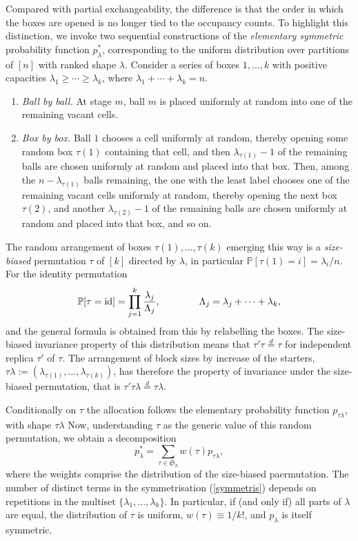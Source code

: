 \documentclass{article}
\begin{document}
Compared with partial exchangeability,
 the difference is that the order in which the boxes are opened is no longer tied to the occupancy counts.
To highlight this distinction, we invoke
two sequential constructions of the {\it elementary symmetric} probability function $p_\lambda^*$, corresponding to the 
uniform distribution over partitions of $[n]$ with
 ranked shape $\lambda$.
 Consider a series of boxes $1,\ldots,k$ with positive capacities $\lambda_1\geq \cdots\geq \lambda_k$, where
$\lambda_1+\cdots+\lambda_k=n$.
\begin{enumerate}

\item[(i)] {\it Ball by ball.}
At stage $m$, ball $m$ is placed uniformly at random into one of the remaining vacant cells.
\item[(ii)] {\it Box by box.}
Ball $1$ chooses a cell uniformly at random, thereby opening some random box $\tau(1)$ containing that cell, and then $\lambda_{\tau(1)}-1$ of the remaining balls are chosen uniformly at random and placed into that box.
Then, among the $n-\lambda_{\tau(1)}$ balls remaining, the one with the least label chooses one of the remaining vacant cells uniformly at random, thereby opening the next box $\tau(2)$, and another $\lambda_{\tau(2)}-1$ of the remaining balls are chosen uniformly at random and placed into that box, and so on.
\end{enumerate}
The random arrangement of boxes $\tau(1),\ldots, \tau(k)$ emerging this way is a {\it size-biased} permutation $\tau$ of $[k]$ directed by $\lambda$, in particular ${\mathbb P}[\tau(1)=i]=\lambda_i/n$.  For the identity permutation 
$${\mathbb P}[\tau={\rm id}]=\prod_{j=1}^k \frac{\lambda_j}{\Lambda_j},~~~\quad\quad~~~\Lambda_j=\lambda_j+\cdots+\lambda_k,$$
and the general formula is obtained  from this   by relabelling the boxes.  
The size-biased invariance property of this distribution means that  $\tau'\tau \stackrel{d}{=}\tau$ for independent replica $\tau'$ of $\tau$.
The arrangement of block sizes by increase of the starters, $\tau\lambda:=(\lambda_{\tau(1)},\ldots,\lambda_{\tau(k)})$, has therefore the property of invariance under the size-biased permutation, that is
$\tau'\tau\lambda\stackrel{d}{=}\tau\lambda$.



Conditionally on $\tau$  the allocation follows the elementary probability function $p_{\tau\lambda}$, with shape $\tau\lambda$
Now, understanding $\tau$ as the generic value of this random permutation, we obtain
a decomposition
\begin{equation}\label{symmetris}
p_\lambda^*=\sum_{\tau\in{\mathfrak S}_k} w(\tau)p_{\tau\lambda},
\end{equation}
where the weights comprise the  distribution of the size-biased paermutation. 
The number of distinct terms in the symmetrisation (\ref{symmetris}) depends on repetitions in the multiset $\{\lambda_1,\ldots,\lambda_k\}$.
 In particular, if (and only if) all parts of $\lambda$ are equal, the distribution of $\tau$ is uniform,  $w(\tau)\equiv 1/k!$, and $p_\lambda$ is itself symmetric.
\end{document}
